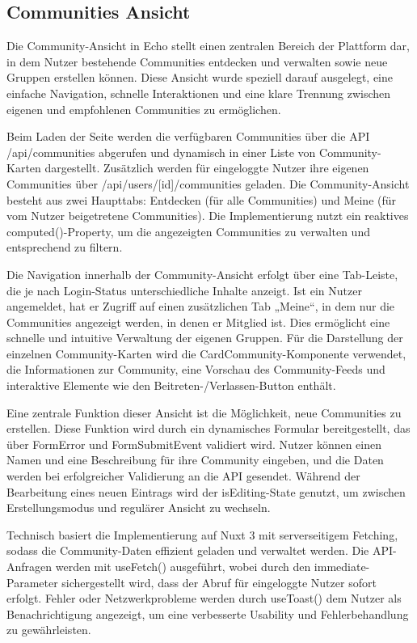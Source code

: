 \documentclass[a4paper,12pt]{article}
\begin{document}
\subsection{Communities Ansicht}
Die Community-Ansicht in Echo stellt einen zentralen Bereich der
Plattform dar, in dem Nutzer bestehende Communities entdecken und verwalten
sowie neue Gruppen erstellen können. Diese Ansicht wurde speziell darauf
ausgelegt, eine einfache Navigation, schnelle Interaktionen und eine klare
Trennung zwischen eigenen und empfohlenen Communities zu ermöglichen.

Beim Laden der Seite werden die verfügbaren Communities über die API
/api/communities abgerufen und dynamisch in einer Liste von Community-Karten
dargestellt. Zusätzlich werden für eingeloggte Nutzer ihre eigenen Communities
über /api/users/[id]/communities geladen. Die Community-Ansicht besteht aus
zwei Haupttabs: Entdecken (für alle Communities) und Meine (für vom Nutzer
beigetretene Communities). Die Implementierung nutzt ein reaktives
computed()-Property, um die angezeigten Communities zu verwalten und
entsprechend zu filtern.

Die Navigation innerhalb der Community-Ansicht erfolgt über eine Tab-Leiste,
die je nach Login-Status unterschiedliche Inhalte anzeigt. Ist ein Nutzer
angemeldet, hat er Zugriff auf einen zusätzlichen Tab „Meine“, in dem nur die
Communities angezeigt werden, in denen er Mitglied ist. Dies ermöglicht eine
schnelle und intuitive Verwaltung der eigenen Gruppen. Für die Darstellung der
einzelnen Community-Karten wird die CardCommunity-Komponente verwendet, die
Informationen zur Community, eine Vorschau des Community-Feeds und interaktive
Elemente wie den Beitreten-/Verlassen-Button enthält.

Eine zentrale Funktion dieser Ansicht ist die Möglichkeit, neue Communities zu
erstellen. Diese Funktion wird durch ein dynamisches Formular bereitgestellt,
das über FormError und FormSubmitEvent validiert wird. Nutzer können einen
Namen und eine Beschreibung für ihre Community eingeben, und die Daten werden
bei erfolgreicher Validierung an die API gesendet. Während der Bearbeitung
eines neuen Eintrags wird der isEditing-State genutzt, um zwischen
Erstellungsmodus und regulärer Ansicht zu wechseln.

Technisch basiert die Implementierung auf Nuxt 3 mit serverseitigem Fetching,
sodass die Community-Daten effizient geladen und verwaltet werden. Die
API-Anfragen werden mit useFetch() ausgeführt, wobei durch den
immediate-Parameter sichergestellt wird, dass der Abruf für eingeloggte Nutzer
sofort erfolgt. Fehler oder Netzwerkprobleme werden durch useToast() dem Nutzer
als Benachrichtigung angezeigt, um eine verbesserte Usability und
Fehlerbehandlung zu gewährleisten.
\end{document}
